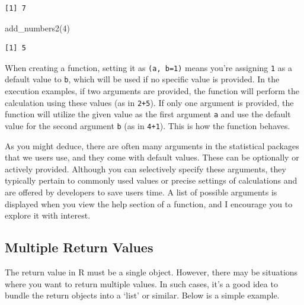 \documentclass[
  a4paper,
]{book}
\newenvironment{Shaded}{\begin{snugshade}}{\end{snugshade}}
\newcommand{\DecValTok}[1]{\textcolor[rgb]{0.68,0.00,0.00}{#1}}
\newcommand{\FunctionTok}[1]{\textcolor[rgb]{0.28,0.35,0.67}{#1}}
\newcommand{\NormalTok}[1]{\textcolor[rgb]{0.00,0.23,0.31}{#1}}
\begin{document}
\begin{verbatim}
[1] 7
\end{verbatim}

\begin{Shaded}
\begin{Highlighting}[]
\FunctionTok{add\_numbers2}\NormalTok{(}\DecValTok{4}\NormalTok{)}
\end{Highlighting}
\end{Shaded}

\begin{verbatim}
[1] 5
\end{verbatim}

When creating a function, setting it as \texttt{(a,\ b=1)} means you're
assigning \texttt{1} as a default value to \texttt{b}, which will be
used if no specific value is provided. In the execution examples, if two
arguments are provided, the function will perform the calculation using
these values (as in \texttt{2+5}). If only one argument is provided, the
function will utilize the given value as the first argument \texttt{a}
and use the default value for the second argument \texttt{b} (as in
\texttt{4+1}). This is how the function behaves.

As you might deduce, there are often many arguments in the statistical
packages that we users use, and they come with default values. These can
be optionally or actively provided. Although you can selectively specify
these arguments, they typically pertain to commonly used values or
precise settings of calculations and are offered by developers to save
users time. A list of possible arguments is displayed when you view the
help section of a function, and I encourage you to explore it with
interest.

\subsection{Multiple Return Values}\label{multiple-return-values}

The return value in R must be a single object. However, there may be
situations where you want to return multiple values. In such cases, it's
a good idea to bundle the return objects into a `list' or similar. Below
is a simple example.
\end{document}
